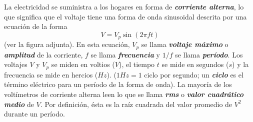 \documentclass[12pt]{article}
\begin{document}
La electricidad se suministra a los hogares en forma de \textbf{\textit{corriente alterna}}, lo que significa que el voltaje tiene una forma de onda sinusoidal descrita por una ecuación de la forma
\[
V = V_p \sin{(2\pi ft)}
\]
(ver la figura adjunta). En esta ecuación, $V_p$ se llama \textbf{\textit{voltaje máximo}} o \textbf{\textit{amplitud}} de la corriente, $f$ se llama \textbf{\textit{frecuencia}} y $1/f$ se llama \textbf{\textit{período}}. Los voltajes $V$ y $V_p$ se miden en voltios ($V$), el tiempo $t$ se mide en segundos ($s$) y la frecuencia se mide en hercios ($Hz$). ($1 Hz = 1$ ciclo por segundo; un \textbf{\textit{ciclo}} es el término eléctrico para un período de la forma de onda). La mayoría de los voltímetros de corriente alterna leen lo que se llama \textbf{\textit{rms}} o \textbf{\textit{valor cuadrático medio}} de $V$. Por definición, ésta es la raíz cuadrada del valor promedio de $V^2$ durante un período.
\end{document}
